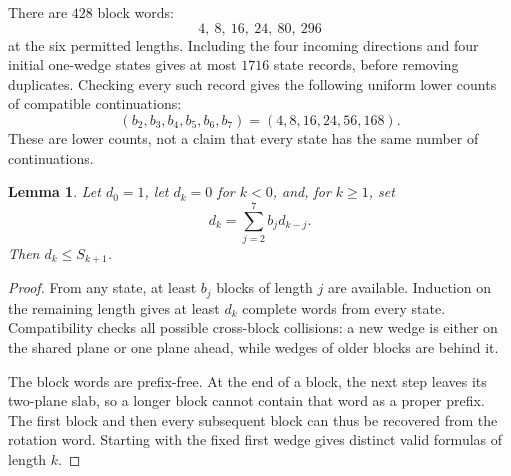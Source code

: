 \documentclass[conference]{IEEEtran}
\newtheorem{lemma}[theorem]{Lemma}
\begin{document}
There are $428$ block words:
\[
4,\ 8,\ 16,\ 24,\ 80,\ 296
\]
at the six permitted lengths. Including the four incoming directions
and four initial one-wedge states gives at most $1716$ state records,
before removing duplicates. Checking every such record gives the
following uniform lower counts of compatible continuations:
\begin{equation}\label{eq:interface-counts}
 (b_2,b_3,b_4,b_5,b_6,b_7)=(4,8,16,24,56,168).
\end{equation}
These are lower counts, not a claim that every state has the same
number of continuations.

\begin{lemma}\label{lem:interface}
Let $d_0=1$, let $d_k=0$ for $k<0$, and, for $k\geq1$, set
\begin{equation}\label{eq:interface-renewal}
 d_k=\sum_{j=2}^7b_jd_{k-j}.
\end{equation}
Then $d_k\leq S_{k+1}$.
\end{lemma}
\begin{proof}
From any state, at least $b_j$ blocks of length $j$ are available.
Induction on the remaining length gives at least $d_k$ complete
words from every state. Compatibility checks all possible
cross-block collisions: a new wedge is either on the shared plane
or one plane ahead, while wedges of older blocks are behind it.

The block words are prefix-free. At the end of a block, the next
step leaves its two-plane slab, so a longer block cannot contain
that word as a proper prefix. The first block and then every
subsequent block can thus be recovered from the rotation word.
Starting with the fixed first wedge gives distinct valid formulas
of length $k$.
\end{proof}
\end{document}

